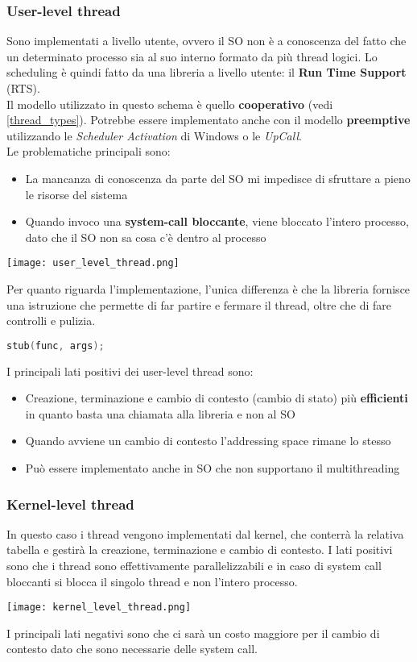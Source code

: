\subsubsection{User-level thread}
Sono implementati a livello utente, ovvero il SO non è a conoscenza del fatto che un determinato processo sia al suo interno formato da più thread logici. Lo scheduling è quindi fatto da una libreria a livello utente: il \textbf{Run Time Support} (RTS).\\
Il modello utilizzato in questo schema è quello \textbf{cooperativo} (vedi \ref{thread_types}). Potrebbe essere implementato anche con il modello \textbf{preemptive} utilizzando le \emph{Scheduler Activation} di Windows o le \emph{UpCall}.\\
Le problematiche principali sono:
\begin{itemize}
	\item La mancanza di conoscenza da parte del SO mi impedisce di sfruttare a pieno le risorse del sistema
	\item Quando invoco una \textbf{system-call bloccante}, viene bloccato l'intero processo, dato che il SO non sa cosa c'è dentro al processo
\end{itemize}
\begin{center}
	\texttt{[image: user\_level\_thread.png]}
\end{center}
Per quanto riguarda l'implementazione, l'unica differenza è che la libreria fornisce una istruzione che permette di far partire e fermare il thread, oltre che di fare controlli e pulizia.
\begin{lstlisting}[language=C]
	stub(func, args);
\end{lstlisting}
I principali lati positivi dei user-level thread sono:
\begin{itemize}
	\item Creazione, terminazione e cambio di contesto (cambio di stato) più \textbf{efficienti} in quanto basta una chiamata alla libreria e non al SO
	\item Quando avviene un cambio di contesto l'addressing space rimane lo stesso
	\item Può essere implementato anche in SO che non supportano il multithreading
\end{itemize}

\subsubsection{Kernel-level thread}
In questo caso i thread vengono implementati dal kernel, che conterrà la relativa tabella e gestirà la creazione, terminazione e cambio di contesto. I lati positivi sono che i thread sono effettivamente parallelizzabili e in caso di system call bloccanti si blocca il singolo thread e non l'intero processo.
\begin{center}
	\texttt{[image: kernel\_level\_thread.png]}
\end{center}
I principali lati negativi sono che ci sarà un costo maggiore per il cambio di contesto dato che sono necessarie delle system call.

